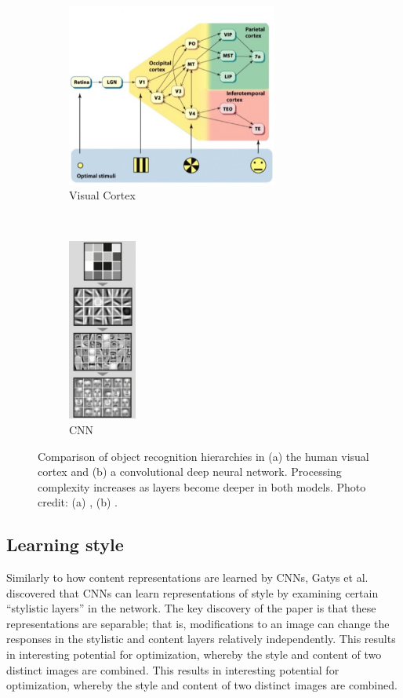 \documentclass[11pt,letterpaper,journal]{IEEEtran}
\begin{document}
\begin{figure}[t!]
  \centering

    \begin{subfigure}[t]{0.5\textwidth}
        \centering
        \includegraphics[height=6cm]{vc.png}
        \caption{Visual Cortex}
        \label{fig:vc}
    \end{subfigure}%
    ~
    \begin{subfigure}[t]{0.5\textwidth}
        \centering
        \includegraphics[height=6cm]{cnn.png}
        \caption{CNN}
        \label{fig:cnn}
    \end{subfigure}

    \caption{Comparison of object recognition hierarchies in (a) the human
    visual cortex and (b) a convolutional deep neural network. Processing
    complexity increases as layers become deeper in both models. Photo credit:
    (a) \cite{gazzaniga09}, (b) \cite{ufldl}.}
    \label{fig:comparison}
\end{figure}

\subsection{Learning style}

Similarly to how content representations are learned by CNNs, Gatys et al.
discovered that CNNs can learn representations of style by
examining certain ``stylistic layers'' in the network. The key discovery of the
paper is that these representations are separable; that is, modifications to an
image can change the responses in the stylistic and content layers relatively
independently. This results in interesting potential for optimization, whereby
the style and content of two distinct images are combined.
 This results in interesting potential for optimization, whereby the style and
 content of two distinct images are combined.
\end{document}
